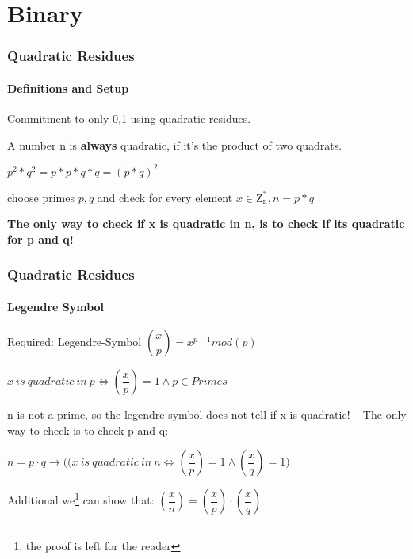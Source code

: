 \section{Binary}

\begin{frame}
	\frametitle{Quadratic Residues}
	\framesubtitle{Definitions and Setup}
	Commitment to only {0,1} using quadratic residues. ~\newline
	
	A number n is \textbf{always} quadratic, if it's the product of two quadrats. ~\newline
	\begin{center}
		$p^2 * q ^2 = p * p * q * q = (p*q)^2$ 
	\end{center}

	choose primes $p,q$ and check for every element $x \in \mathrm{Z_n^*} , n=p*q$ ~\newline ~\newline
	
	\textbf{The only way to check if x is quadratic in n, is to check if its quadratic for p and q!}
\end{frame}
\begin{frame}
	\frametitle{Quadratic Residues}
	\framesubtitle{Legendre Symbol}
	Required: Legendre-Symbol $(\dfrac{x}{p}) = x^{p-1} mod(p)$ ~\newline ~\newline
	\begin{center}
	$x~is~quadratic~in~p \iff (\dfrac{x}{p})=1 \land p \in Primes$ ~\newline ~\newline
\end{center}
	n is not a prime, so the legendre symbol does not tell if x is quadratic! ~\newline 
	The only way to check is to check p and q: ~\newline 
	\begin{center}
	$ n = p\cdot q \rightarrow \big((x~is~quadratic~in~n \iff (\dfrac{x}{p})=1 \land (\dfrac{x}{q})=1\big)$ ~\newline ~\newline
\end{center}
	
	Additional we\footnote{the proof is left for the reader} can show that: $(\dfrac{x}{n}) = (\dfrac{x}{p}) \cdot (\dfrac{x}{q})$ 
\end{frame}
